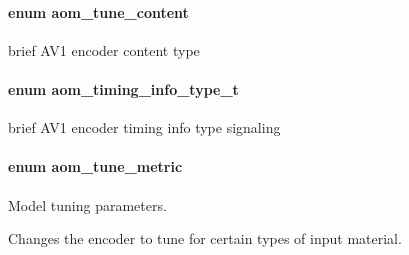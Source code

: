 \paragraph[{\texorpdfstring{aom\+\_\+tune\+\_\+content}{aom_tune_content}}]{\setlength{\rightskip}{0pt plus 5cm}enum {\bf aom\+\_\+tune\+\_\+content}}\hypertarget{group__aom__encoder_ga801f5eb2cb93da19a2f347ae7a44166a}{}\label{group__aom__encoder_ga801f5eb2cb93da19a2f347ae7a44166a}
brief A\+V1 encoder content type 
\paragraph[{\texorpdfstring{aom\+\_\+timing\+\_\+info\+\_\+type\+\_\+t}{aom_timing_info_type_t}}]{\setlength{\rightskip}{0pt plus 5cm}enum {\bf aom\+\_\+timing\+\_\+info\+\_\+type\+\_\+t}}\hypertarget{group__aom__encoder_gad69c1d6aa10530991eeb1a3f0a818cba}{}\label{group__aom__encoder_gad69c1d6aa10530991eeb1a3f0a818cba}
brief A\+V1 encoder timing info type signaling 
\paragraph[{\texorpdfstring{aom\+\_\+tune\+\_\+metric}{aom_tune_metric}}]{\setlength{\rightskip}{0pt plus 5cm}enum {\bf aom\+\_\+tune\+\_\+metric}}\hypertarget{group__aom__encoder_gaafd352cc596fab5388558950f8bbe739}{}\label{group__aom__encoder_gaafd352cc596fab5388558950f8bbe739}


Model tuning parameters. 

Changes the encoder to tune for certain types of input material. 